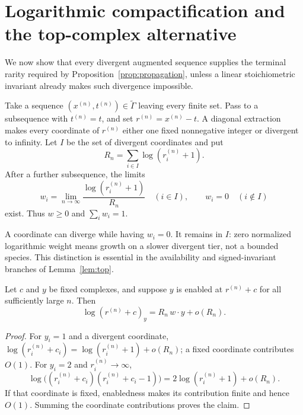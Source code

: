 \section{Logarithmic compactification and the top-complex alternative}
\label{sec:compact}

We now show that every divergent augmented sequence supplies the terminal
rarity required by Proposition~\ref{prop:propagation}, unless a linear
stoichiometric invariant already makes such divergence impossible.

Take a sequence \((x^{(n)},t^{(n)})\in\widetilde\Gamma\) leaving every finite
set.  Pass to a subsequence with \(t^{(n)}=t\), and set
\(r^{(n)}=x^{(n)}-t\).  A diagonal extraction makes every coordinate of
\(r^{(n)}\) either one fixed nonnegative integer or divergent to infinity.
Let \(I\) be the set of divergent coordinates and put
\begin{equation}\label{eq:Rn}
  R_n=\sum_{i\in I}\log(r_i^{(n)}+1).
\end{equation}
After a further subsequence, the limits
\begin{equation}\label{eq:weights}
  w_i=\lim_{n\to\infty}
  \frac{\log(r_i^{(n)}+1)}{R_n}
  \quad(i\in I),
  \qquad w_i=0\quad(i\notin I)
\end{equation}
exist.  Thus \(w\ge0\) and \(\sum_iw_i=1\).

\begin{remark}\label{rem:zero-weight}
A coordinate can diverge while having \(w_i=0\).  It remains in \(I\): zero
normalized logarithmic weight means growth on a slower divergent tier, not a
bounded species.  This distinction is essential in the availability and
signed-invariant branches of Lemma~\ref{lem:top}.
\end{remark}

\begin{lemma}\label{lem:ff-asymptotic}
Let \(c\) and \(y\) be fixed complexes, and suppose \(y\) is enabled at
\(r^{(n)}+c\) for all sufficiently large \(n\).  Then
\begin{equation}\label{eq:ff-asymptotic}
  \log(r^{(n)}+c)_y=R_n\,w\cdot y+o(R_n).
\end{equation}
\end{lemma}

\begin{proof}
For \(y_i=1\) and a divergent coordinate,
\(\log(r_i^{(n)}+c_i)=\log(r_i^{(n)}+1)+o(R_n)\); a fixed coordinate
contributes \(O(1)\).  For \(y_i=2\) and \(r_i^{(n)}\to\infty\),
\[
 \log\bigl((r_i^{(n)}+c_i)(r_i^{(n)}+c_i-1)\bigr)
 =2\log(r_i^{(n)}+1)+o(R_n).
\]
If that coordinate is fixed, enabledness makes its contribution finite and
hence \(O(1)\).  Summing the coordinate contributions proves the claim.
\end{proof}

